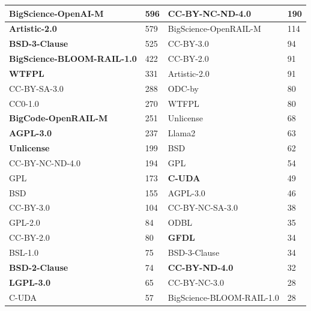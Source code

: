 \begin{table}[h]
\begin{tabular}{|ll||ll|}
  \multicolumn{1}{|l|}{\textbf{BigScience-OpenAI-M}} & 596 & \multicolumn{1}{l|}{\textbf{CC-BY-NC-ND-4.0}} & 190 \\ \hline
  \multicolumn{1}{|l|}{\textbf{Artistic-2.0}} & 579 & \multicolumn{1}{l|}{BigScience-OpenRAIL-M} & 114 \\ \hline
  \multicolumn{1}{|l|}{\textbf{BSD-3-Clause}} & 525 & \multicolumn{1}{l|}{CC-BY-3.0} & 94 \\ \hline
  \multicolumn{1}{|l|}{\textbf{BigScience-BLOOM-RAIL-1.0}} & 422 & \multicolumn{1}{l|}{CC-BY-2.0} & 91 \\ \hline
  \multicolumn{1}{|l|}{\textbf{WTFPL}} & 331 & \multicolumn{1}{l|}{Artistic-2.0} & 91 \\ \hline
  \multicolumn{1}{|l|}{CC-BY-SA-3.0} & 288 & \multicolumn{1}{l|}{ODC-by} & 80 \\ \hline
  \multicolumn{1}{|l|}{CC0-1.0} & 270 & \multicolumn{1}{l|}{WTFPL} & 80 \\ \hline
  \multicolumn{1}{|l|}{\textbf{BigCode-OpenRAIL-M}} & 251 & \multicolumn{1}{l|}{Unlicense} & 68 \\ \hline
  \multicolumn{1}{|l|}{\textbf{AGPL-3.0}} & 237 & \multicolumn{1}{l|}{Llama2} & 63 \\ \hline
  \multicolumn{1}{|l|}{\textbf{Unlicense}} & 199 & \multicolumn{1}{l|}{BSD} & 62 \\ \hline
  \multicolumn{1}{|l|}{CC-BY-NC-ND-4.0} & 194 & \multicolumn{1}{l|}{GPL} & 54 \\ \hline
  \multicolumn{1}{|l|}{GPL} & 173 & \multicolumn{1}{l|}{\textbf{C-UDA}} & 49 \\ \hline
  \multicolumn{1}{|l|}{BSD} & 155 & \multicolumn{1}{l|}{AGPL-3.0} & 46 \\ \hline
  \multicolumn{1}{|l|}{CC-BY-3.0} & 104 & \multicolumn{1}{l|}{CC-BY-NC-SA-3.0} & 38 \\ \hline
  \multicolumn{1}{|l|}{GPL-2.0} & 84 & \multicolumn{1}{l|}{ODBL} & 35 \\ \hline
  \multicolumn{1}{|l|}{CC-BY-2.0} & 80 & \multicolumn{1}{l|}{\textbf{GFDL}} & 34 \\ \hline
  \multicolumn{1}{|l|}{BSL-1.0} & 75 & \multicolumn{1}{l|}{BSD-3-Clause} & 34 \\ \hline
  \multicolumn{1}{|l|}{\textbf{BSD-2-Clause}} & 74 & \multicolumn{1}{l|}{\textbf{CC-BY-ND-4.0}} & 32 \\ \hline
  \multicolumn{1}{|l|}{\textbf{LGPL-3.0}} & 65 & \multicolumn{1}{l|}{CC-BY-NC-3.0} & 28 \\ \hline
  \multicolumn{1}{|l|}{C-UDA} & 57 & \multicolumn{1}{l|}{BigScience-BLOOM-RAIL-1.0} & 28 \\ \hline

\end{tabular}
\end{table}
